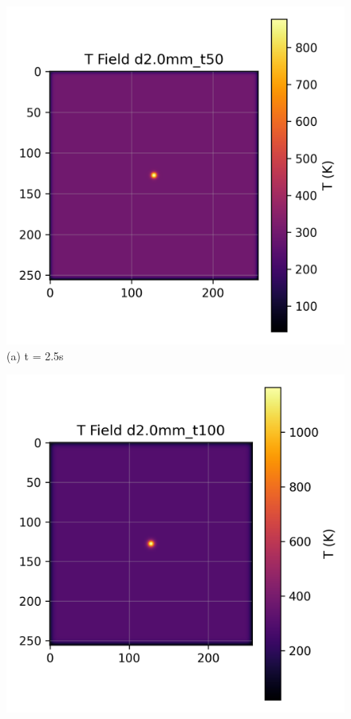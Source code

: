 \begin{figure}[H]
    \centering
    \begin{minipage}{0.48\textwidth}
        \centering
        \includegraphics[width=\textwidth]{figures/simulations/field_d2.0mm_t50.png}
        \\{\small (a) t = 2.5s}
    \end{minipage}
    \hfill
    \begin{minipage}{0.48\textwidth}
        \centering
        \includegraphics[width=\textwidth]{figures/simulations/field_d2.0mm_t100.png}

\end{minipage}
\end{figure}

